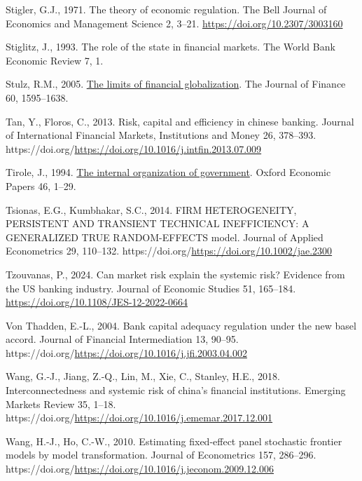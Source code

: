 \documentclass[
  12pt,
  a4paper,
]{scrreprt}
\newlength{\cslhangindent}
\newenvironment{CSLReferences}[2] %
 {\begin{list}{}{%
  \setlength{\itemindent}{0pt}
  \setlength{\leftmargin}{0pt}
  \setlength{\parsep}{0pt}
  \ifodd #1
   \setlength{\leftmargin}{\cslhangindent}
   \setlength{\itemindent}{-1\cslhangindent}
  \fi
  \setlength{\itemsep}{#2\baselineskip}}}
 {\end{list}}
\begin{document}
\begin{CSLReferences}{1}{0}
Stigler, G.J., 1971. The theory of economic regulation. The Bell Journal
of Economics and Management Science 2, 3--21.
\url{https://doi.org/10.2307/3003160}

Stiglitz, J., 1993. The role of the state in financial markets. The
World Bank Economic Review 7, 1.

Stulz, R.M., 2005.
\href{http://www.jstor.org.queens.ezp1.qub.ac.uk/stable/3694849}{The
limits of financial globalization}. The Journal of Finance 60,
1595--1638.

Tan, Y., Floros, C., 2013. Risk, capital and efficiency in chinese
banking. Journal of International Financial Markets, Institutions and
Money 26, 378--393.
https://doi.org/\url{https://doi.org/10.1016/j.intfin.2013.07.009}

Tirole, J., 1994. \href{http://www.jstor.org/stable/2663521}{The
internal organization of government}. Oxford Economic Papers 46, 1--29.

Tsionas, E.G., Kumbhakar, S.C., 2014. FIRM HETEROGENEITY, PERSISTENT AND
TRANSIENT TECHNICAL INEFFICIENCY: A GENERALIZED TRUE RANDOM-EFFECTS
model. Journal of Applied Econometrics 29, 110--132.
https://doi.org/\url{https://doi.org/10.1002/jae.2300}

Tzouvanas, P., 2024. Can market risk explain the systemic risk? Evidence
from the US banking industry. Journal of Economic Studies 51, 165--184.
\url{https://doi.org/10.1108/JES-12-2022-0664}

Von Thadden, E.-L., 2004. Bank capital adequacy regulation under the new
basel accord. Journal of Financial Intermediation 13, 90--95.
https://doi.org/\url{https://doi.org/10.1016/j.jfi.2003.04.002}

Wang, G.-J., Jiang, Z.-Q., Lin, M., Xie, C., Stanley, H.E., 2018.
Interconnectedness and systemic risk of china's financial institutions.
Emerging Markets Review 35, 1--18.
https://doi.org/\url{https://doi.org/10.1016/j.ememar.2017.12.001}

Wang, H.-J., Ho, C.-W., 2010. Estimating fixed-effect panel stochastic
frontier models by model transformation. Journal of Econometrics 157,
286--296.
https://doi.org/\url{https://doi.org/10.1016/j.jeconom.2009.12.006}


\end{CSLReferences}
\end{document}
